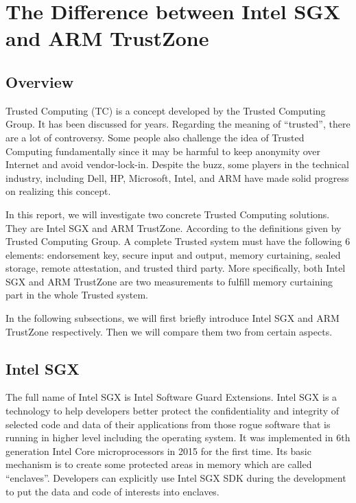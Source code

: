 \section{The Difference between Intel SGX and ARM TrustZone}\label{sec:difference}







\subsection{Overview}
Trusted Computing (TC) is a concept developed by the Trusted Computing Group.
It has been discussed for years. Regarding the meaning of ``trusted'', there
are a lot of controversy. Some people also challenge the idea of Trusted
Computing fundamentally since it may be harmful to keep anonymity over 
Internet and avoid vendor-lock-in. Despite the buzz, some players in 
the technical industry, including Dell, HP, Microsoft, Intel, and ARM 
have made solid progress on realizing this concept.

In this report, we will investigate two concrete Trusted Computing solutions.
They are Intel SGX and ARM TrustZone. 
According to the definitions given by Trusted Computing Group. A complete 
Trusted system must have the following 6 elements: endorsement key, 
secure input and output, memory curtaining, sealed storage, remote 
attestation, and trusted third party. More specifically, both Intel
SGX and ARM TrustZone are two measurements to fulfill memory curtaining
part in the whole Trusted system.  
 
In the following subsections, we will first briefly introduce 
Intel SGX and ARM TrustZone respectively. Then we will compare 
them two from certain aspects.


\subsection{Intel SGX}
The full name of Intel SGX is Intel Software Guard Extensions. Intel
SGX is a technology to help developers better protect the 
confidentiality and integrity of selected code and data of their 
applications from those rogue software that is running in higher
level including the operating system. It was implemented in 6th
generation Intel Core microprocessors in 2015 for the first time.
Its basic mechanism is to create some protected areas in memory 
which are called ``enclaves''. Developers can explicitly use Intel
SGX SDK during the development to put the data and code of interests 
into enclaves.   



